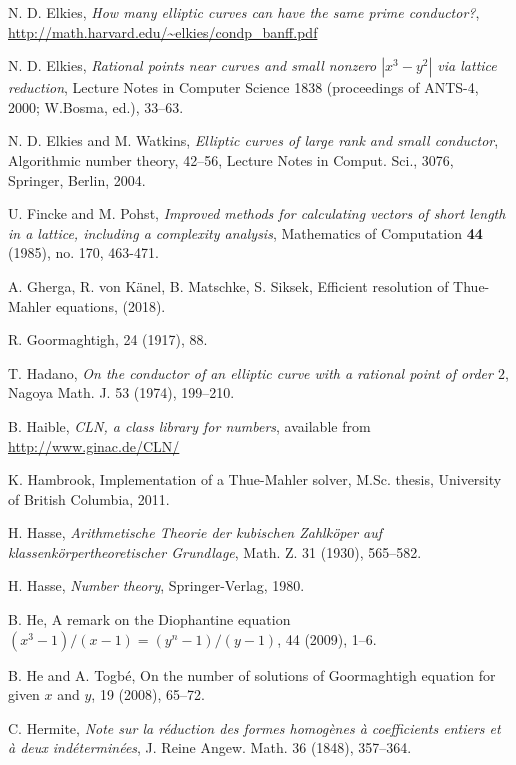 \begin{thebibliography}{}
N. D. Elkies,
\emph{How many elliptic curves can have the same prime conductor?}, 
\url{http://math.harvard.edu/~elkies/condp_banff.pdf}

N. D. Elkies,
\emph{Rational points near curves and small nonzero $|x^3-y^2|$ via lattice reduction}, 
Lecture Notes in Computer Science 1838 (proceedings of ANTS-4, 2000; W.Bosma, ed.), 33--63.

N. D. Elkies and M. Watkins,
\emph{Elliptic curves of large rank and small conductor},
 Algorithmic number theory, 42--56, Lecture Notes in Comput. Sci., 3076, Springer, Berlin, 2004.

U. Fincke and M. Pohst, 
\emph{Improved methods for calculating vectors of short length in a lattice, including a complexity analysis}, Mathematics of Computation \textbf{44} (1985), no. 170, 463-471.

A. Gherga, R. von K\"{a}nel, B. Matschke, S. Siksek, 
\newblock Efficient resolution of Thue-Mahler equations, 
 (2018).

R. Goormaghtigh,
 24 (1917), 88.

T. Hadano,
\emph{On the conductor of an elliptic curve with a rational point of order $2$},
Nagoya Math. J. 53 (1974), 199--210.

B. Haible, 
\emph{CLN, a class library for 
numbers}, available from \url{http://www.ginac.de/CLN/}

K. Hambrook,
\newblock Implementation of a Thue-Mahler solver,
\newblock M.Sc. thesis, University of British Columbia, 2011.
	
H. Hasse,
\emph{Arithmetische Theorie der kubischen Zahlk\"{o}per auf klassenk\"{o}rpertheoretischer Grundlage},
Math. Z. 31 (1930), 565--582.

H. Hasse, 
\emph{Number theory}, 
Springer-Verlag, 1980.

B. He,
\newblock A remark on the Diophantine equation $(x^3-1)/(x-1)=(y^n-1)/(y-1)$,
 44 (2009), 1--6.

B. He and A. Togb\'e,
\newblock On the number of solutions of Goormaghtigh equation for given $x$ and $y$,
 19 (2008), 65--72.

C. Hermite,
\emph{Note sur la r\'eduction des formes homog\`enes \`a 
coefficients entiers et  \`a deux ind\'etermin\'ees},
J. Reine Angew. Math. 36 (1848), 357--364.


\end{thebibliography}
